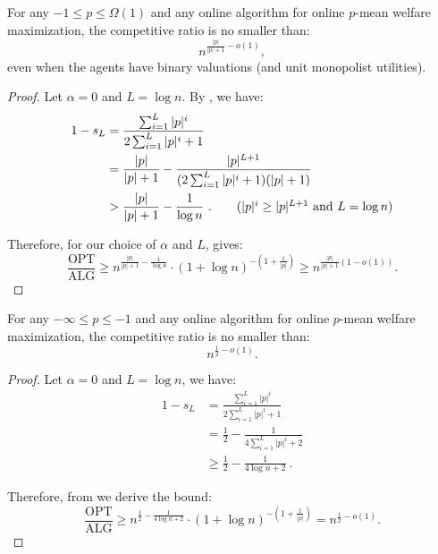 \documentclass[11pt,letterpaper]{article}
\newcommand{\OPT}{\mathrm{OPT}}
\newcommand{\ALG}{\mathrm{ALG}}
\begin{document}
\begin{theorem}
	\label{thm:hardness-nashian-to-harmonic}
	For any $-1 \le p \le \Omega(1)$ and any online algorithm for online $p$-mean welfare maximization, the competitive ratio is no smaller than:
	\[
		n^{\frac{|p|}{|p|+1}-o(1)}
        ,
	\]
    even when the agents have binary valuations (and unit monopolist utilities).
\end{theorem}

\begin{proof}
	Let $\alpha = 0$ and $L = \log n$.
	By , we have:
	\begin{align*}
	    1 - s_L 
	    &
	    = \frac{\sum_{i=1}^L |p|^i}{2\sum_{i=1}^L |p|^i +1}  \\
	    &
	    = \frac{|p|}{|p|+1} -\frac{|p|^{L+1}}{(2\sum_{i=1}^L |p|^i+1)(|p|+1)} \\
	    &
	    > \frac{|p|}{|p|+1} - \frac{1}{\log n}
	    ~.
	    \tag{$|p|^i \ge |p|^{L+1}$ and $L = \log n$}
	\end{align*}
	
	Therefore, for our choice of $\alpha$ and $L$,  gives:
	\begin{equation*}
	    \frac{\OPT}{\ALG} \geq n^{\frac{|p|}{|p|+1} - \frac{1}{\log n}} \cdot \left( 1+ \log n \right)^{-(1+\frac{1}{|p|})} \geq n^{\frac{|p|}{|p|+1}(1-o(1))}.
	\end{equation*}	
\end{proof}

\begin{theorem}
	\label{thm:hardness-harmonic-to-egalitarian}
	For any $-\infty \le p \le -1$ and any online algorithm for online $p$-mean welfare maximization, the competitive ratio is no smaller than:
	\[
		n^{\frac{1}{2}-o(1)}
        .
	\]
\end{theorem}

\begin{proof}
	Let $\alpha = 0$ and $L = \log n$, we have:
	\begin{align*}
	    1 - s_L 
	    &
	    = \frac{\sum_{i=1}^L |p|^i}{2\sum_{i=1}^L |p|^i +1} \\
	    &
	    = \frac{1}{2} -\frac{1}{4\sum_{i=1}^L |p|^i+2} \\ 
	    &
	    \geq \frac{1}{2} - \frac{1}{4\log n+2}
	    ~.
	    \tag{$|p| \ge 1$ and $L = \log n$}
	\end{align*}
	
	Therefore, from  we derive the bound:
	\begin{equation*}
	    \frac{\OPT}{\ALG} \geq n^{\frac{1}{2}-\frac{1}{4\log n+2}} \cdot (1+\log n)^{-(1+\frac{1}{|p|})} = n^{\frac{1}{2}-o(1)}
	    .
	\end{equation*}	
\end{proof}
\end{document}
